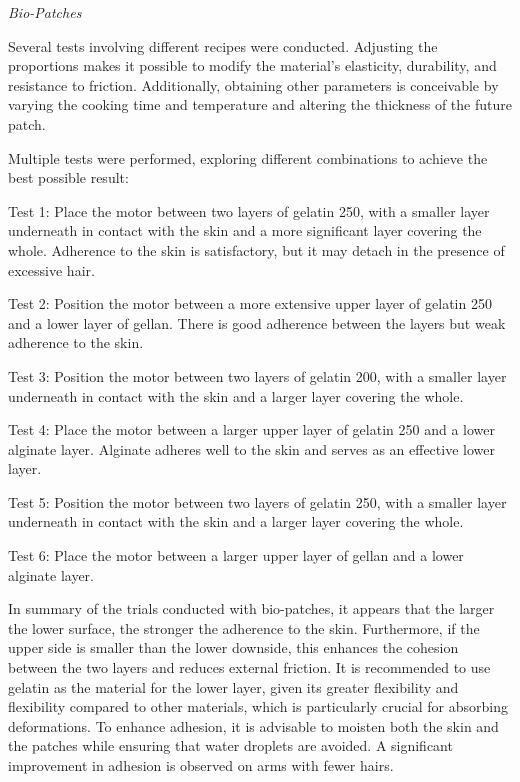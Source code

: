 \textit{Bio-Patches}

Several tests involving different recipes were conducted. Adjusting the proportions makes it possible to modify the material's elasticity, durability, and resistance to friction. Additionally, obtaining other parameters is conceivable by varying the cooking time and temperature and altering the thickness of the future patch.

Multiple tests were performed, exploring different combinations to achieve the best possible result:

\item Test 1: Place the motor between two layers of gelatin 250, with a smaller layer underneath in contact with the skin and a more significant layer covering the whole. Adherence to the skin is satisfactory, but it may detach in the presence of excessive hair.
\item Test 2: Position the motor between a more extensive upper layer of gelatin 250 and a lower layer of gellan. There is good adherence between the layers but weak adherence to the skin.
\item Test 3: Position the motor between two layers of gelatin 200, with a smaller layer underneath in contact with the skin and a larger layer covering the whole.
\item Test 4: Place the motor between a larger upper layer of gelatin 250 and a lower alginate layer. Alginate adheres well to the skin and serves as an effective lower layer.
\item Test 5: Position the motor between two layers of gelatin 250, with a smaller layer underneath in contact with the skin and a larger layer covering the whole.
\item Test 6: Place the motor between a larger upper layer of gellan and a lower alginate layer.

In summary of the trials conducted with bio-patches, it appears that the larger the lower surface, the stronger the adherence to the skin. Furthermore, if the upper side is smaller than the lower downside, this enhances the cohesion between the two layers and reduces external friction. It is recommended to use gelatin as the material for the lower layer, given its greater flexibility and flexibility compared to other materials, which is particularly crucial for absorbing deformations. To enhance adhesion, it is advisable to moisten both the skin and the patches while ensuring that water droplets are avoided. A significant improvement in adhesion is observed on arms with fewer hairs.

